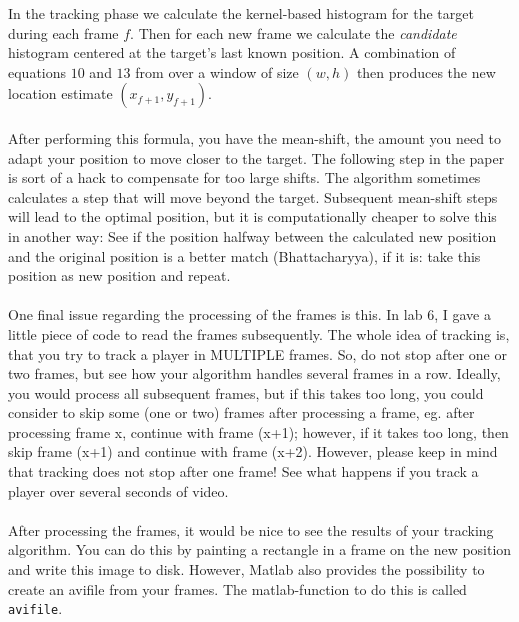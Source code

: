 \documentclass[a4paper,11pt]{article}
\begin{document}
		In the tracking phase we calculate the kernel-based histogram for the target during
		each frame $f$. Then for each new frame we calculate the \textit{candidate} histogram
		centered at the target's last known position. A combination of equations $10$ and $13$
		from \cite{KBOT} over a window of size $(w, h)$ then produces the new location estimate
		$(x_{f+1}, y_{f+1})$.
		\\ \\
		After performing this formula, you have the mean-shift, the amount you need to adapt your
		position to move closer to the target. The following step in the paper is sort of a hack
		to compensate for too large shifts. The algorithm sometimes calculates a step that will
		move beyond the target. Subsequent mean-shift steps will lead to the optimal position,
		but it is computationally cheaper to solve this in another way: See if the position halfway
		between the calculated new position and the original position is a better match (Bhattacharyya),
		if it is: take this position as new position and repeat.
		\\ \\
		One final issue regarding the processing of the frames is this. In lab 6, I gave a little
		piece of code to read the frames subsequently. The whole idea of tracking is, that you try
		to track a player in MULTIPLE frames. So, do not stop after one or two frames, but see how
		your algorithm handles several frames in a row. Ideally, you would process all subsequent
		frames, but if this takes too long, you could consider to skip some (one or two) frames
		after processing a frame, eg. after processing frame x, continue with frame (x+1); however,
		if it takes too long, then skip frame (x+1) and continue with frame (x+2). However, please
		keep in mind that tracking does not stop after one frame! See what happens if you track a
		player over several seconds of video.
		\\ \\
		After processing the frames, it would be nice to see the results of your tracking algorithm.
		You can do this by painting a rectangle in a frame on the new position and write this image
		to disk. However, Matlab also provides the possibility to create an avifile from your frames.
		The matlab-function to do this is called \verb|avifile|. 
\end{document}
